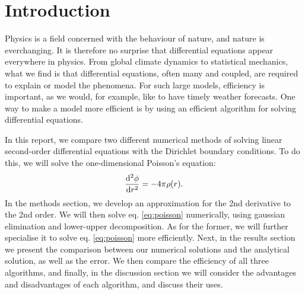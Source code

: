 \section{Introduction}
\label{sec:introduction}

Physics is a field concerned with the behaviour of nature, and nature is
everchanging. It is therefore no surprise that differential equations appear
everywhere in physics. From global climate dynamics to statistical mechanics,
what we find is that differential equations, often many and coupled, are
required to explain or model the phenomena. For such large models, efficiency
is important, as we would, for example, like to have timely weather forecasts.
One way to make a model more efficient is by using an efficient algorithm for
solving differential equations.

In this report, we compare two different numerical methods of solving linear
second-order differential equations with the Dirichlet boundary conditions.
To do this, we will solve the one-dimensional Poisson's equation:
  \begin{equation}
  \label{eq:poisson}
    \dv[2]{\phi}{r} = -4\pi \rho\qty(r).
  \end{equation}
In the methods section, we develop an approximation for the
2nd derivative to the 2nd order. We will then solve eq. \ref{eq:poisson}
numerically, using gaussian elimination and lower-upper decomposition. As for
the former, we will further specialise it to solve eq. \ref{eq:poisson} more
efficiently. Next, in the results section we present the comparison
between our numerical solutions and the analytical solution, as well as the error.
We then compare the efficiency of all three algorithms, and finally, in the
discussion section we will consider the advantages and disadvantages
of each algorithm, and discuss their uses.
